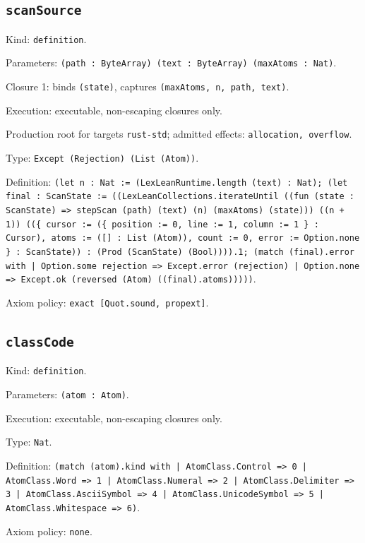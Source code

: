 \documentclass[11pt]{article}
\begin{document}
\subsection*{\texttt{scanSource}}
\noindent Kind: \texttt{definition}.\par
\noindent Parameters: \texttt{(path : ByteArray) (text : ByteArray) (maxAtoms : Nat)}.\par
\noindent Closure 1: binds \texttt{(state)}, captures \texttt{(maxAtoms, n, path, text)}.\par
\noindent Execution: executable, non-escaping closures only.\par
\noindent Production root for targets \texttt{rust-std}; admitted effects: \texttt{allocation, overflow}.\par
\noindent Type: \texttt{Except (Rejection) (List (Atom))}.\par
\noindent Definition: \texttt{(let n : Nat := (LexLeanRuntime.length (text) : Nat); (let final : ScanState := ((LexLeanCollections.iterateUntil ((fun (state : ScanState) => stepScan (path) (text) (n) (maxAtoms) (state))) ((n + 1)) ((\{ cursor := (\{ position := 0, line := 1, column := 1 \} : Cursor), atoms := ([] : List (Atom)), count := 0, error := Option.none \} : ScanState)) : (Prod (ScanState) (Bool)))).1; (match (final).error with | Option.some rejection => Except.error (rejection) | Option.none => Except.ok (reversed (Atom) ((final).atoms)))))}.\par
\noindent Axiom policy: \texttt{exact [Quot.sound, propext]}.\par
\subsection*{\texttt{classCode}}
\noindent Kind: \texttt{definition}.\par
\noindent Parameters: \texttt{(atom : Atom)}.\par
\noindent Execution: executable, non-escaping closures only.\par
\noindent Type: \texttt{Nat}.\par
\noindent Definition: \texttt{(match (atom).kind with | AtomClass.Control => 0 | AtomClass.Word => 1 | AtomClass.Numeral => 2 | AtomClass.Delimiter => 3 | AtomClass.AsciiSymbol => 4 | AtomClass.UnicodeSymbol => 5 | AtomClass.Whitespace => 6)}.\par
\noindent Axiom policy: \texttt{none}.\par
\end{document}
